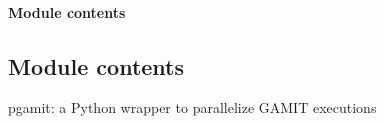 \documentclass[letterpaper,10pt,english]{sphinxmanual}
\begin{document}
\begin{fulllineitems}
\label{\detokenize{pgamit.com:pgamit.com.test_proc.output_handle}}
\pysigstartsignatures
\pysiglinewithargsret
{}
{}
{}
\pysigstopsignatures
\end{fulllineitems}



\paragraph{Module contents}
\label{\detokenize{pgamit.com:module-pgamit.com}}\label{\detokenize{pgamit.com:module-contents}}

\subsection{Module contents}
\label{\detokenize{pgamit:module-pgamit}}\label{\detokenize{pgamit:module-contents}}
\sphinxAtStartPar
pgamit: a Python wrapper to parallelize GAMIT executions
\end{document}
